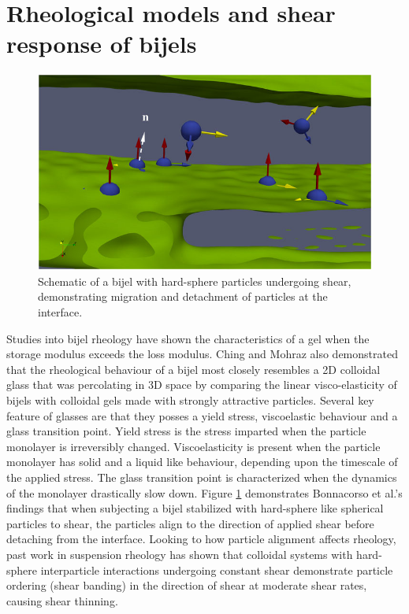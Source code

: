 \section{Rheological models and shear response of bijels}

\begin{figure}
    \centering
    \includegraphics[scale = 2]{figures/literature_review/bijel_under_shear.jpeg}
    \caption{Schematic of a bijel with hard-sphere particles undergoing shear, demonstrating migration and detachment of particles at the interface. 
    \cite{bonaccorso_shear_2020}}
    \label{fig:bijel_under_shear}
\end{figure}

Studies into bijel rheology have shown the characteristics of a gel when the
storage modulus exceeds the loss modulus. \cite{lee_making_2013, bai_dynamics_2015} Ching and Mohraz also demonstrated that the rheological behaviour of a 
bijel most closely resembles a 2D colloidal glass that was percolating in 3D space by comparing the linear visco-elasticity of bijels with colloidal gels made 
with strongly attractive particles. \cite{ching_bijel_2022} Several key feature of glasses are that they posses a yield stress, viscoelastic behaviour and a 
glass transition point. \cite{pham_yielding_2008, weeks_introduction_2017} Yield stress is the stress imparted when the particle monolayer is irreversibly changed. \cite{pham_yielding_2008} Viscoelasticity is present when the particle monolayer has solid and a liquid like behaviour, depending upon the timescale of the applied stress. \cite{pham_yielding_2008} The glass transition point is characterized when the dynamics of the monolayer drastically slow down. \cite{weeks_introduction_2017} Figure \ref{fig:bijel_under_shear} demonstrates Bonnacorso et al.'s findings that when subjecting a bijel stabilized with hard-sphere like spherical particles to shear, the particles align to the direction of applied shear before detaching from the interface. \cite{bonaccorso_shear_2020} Looking to how particle alignment affects rheology, past work in suspension rheology has shown that colloidal systems with hard-sphere interparticle interactions undergoing constant shear demonstrate particle ordering (shear banding) in the direction of shear at moderate shear rates, causing shear thinning. \cite{vermant_flow-induced_2005, brader_nonlinear_2010} 

